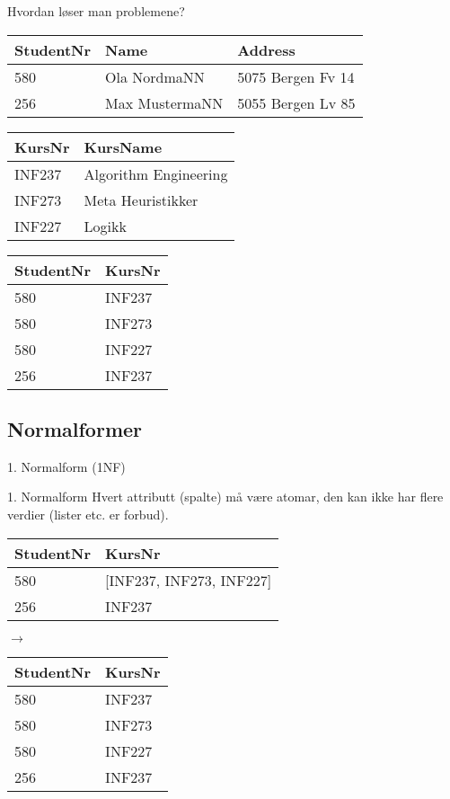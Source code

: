 \begin{frame}{Hvordan løser man problemene?}
\begin{tabular}{l|l|l}
 StudentNr & Name & Address\\\hline
 580 & Ola NordmaNN & 5075 Bergen Fv 14\\
 256 & Max MustermaNN & 5055 Bergen Lv 85\\
\end{tabular}
\vfill
\begin{tabular}{l|l}
KursNr & KursName \\\hline
INF237 & Algorithm Engineering\\
INF273 & Meta Heuristikker\\
INF227 & Logikk\\
\end{tabular}
\hfill
\begin{tabular}{l|l}
 StudentNr & KursNr\\\hline
 580 & INF237\\
 580 & INF273\\
 580 & INF227\\
 256 & INF237\\
\end{tabular}
\end{frame}

\subsection*{Normalformer}
\begin{frame}{1. Normalform (1NF)}
    \begin{block}{1. Normalform}
    Hvert attributt (spalte) må være atomar, den kan ikke har flere verdier (lister etc. er forbud).
    \end{block}
    \vfill
    \pause
    \begin{tabular}{l|l}
     StudentNr & KursNr\\\hline
     580 & [INF237, INF273, INF227]\\
     256 & INF237\\
     \end{tabular}
     \hfill
     \pause
     $\rightarrow$
     \hfill
     \begin{tabular}{l|l}
     StudentNr & KursNr\\\hline
     580 & INF237\\
     580 & INF273\\
     580 & INF227\\
     256 & INF237\\
    \end{tabular}
\end{frame}


